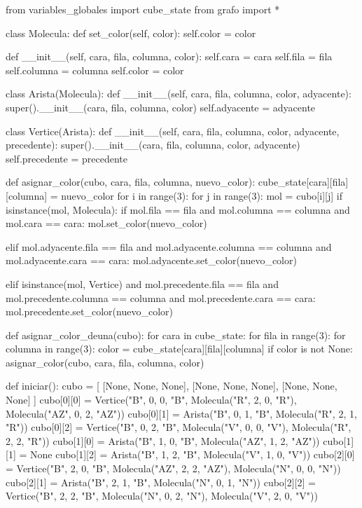 
from variables_globales import cube_state
from grafo import *

class Molecula:
    def set_color(self, color):
        self.color = color
                
    def __init__(self, cara, fila, columna, color):
        self.cara = cara
        self.fila = fila
        self.columna = columna
        self.color = color

class Arista(Molecula):
    def __init__(self, cara, fila, columna, color, adyacente):
        super().__init__(cara, fila, columna, color)
        self.adyacente = adyacente

class Vertice(Arista):
    def __init__(self, cara, fila, columna, color, adyacente, precedente):
        super().__init__(cara, fila, columna, color, adyacente)
        self.precedente = precedente

def asignar_color(cubo, cara, fila, columna, nuevo_color):
    cube_state[cara][fila][columna] = nuevo_color 
    for i in range(3):
        for j in range(3):
            mol = cubo[i][j]
            if isinstance(mol, Molecula):
                if mol.fila == fila and mol.columna == columna and mol.cara == cara:
                    mol.set_color(nuevo_color)
                
                elif mol.adyacente.fila == fila and mol.adyacente.columna == columna and mol.adyacente.cara == cara:
                    mol.adyacente.set_color(nuevo_color)
                    
                elif isinstance(mol, Vertice) and mol.precedente.fila == fila and mol.precedente.columna == columna and mol.precedente.cara == cara:
                    mol.precedente.set_color(nuevo_color)
    
def asignar_color_deuna(cubo):
    for cara in cube_state:
        for fila in range(3):
            for columna in range(3):
                color = cube_state[cara][fila][columna]
                if color is not None:
                    asignar_color(cubo, cara, fila, columna, color)
    
def iniciar():
    cubo = [
        [None, None, None],
        [None, None, None],
        [None, None, None]
    ]
    cubo[0][0] = Vertice("B", 0, 0, "B", Molecula("R", 2, 0, "R"), Molecula("AZ", 0, 2, "AZ"))
    cubo[0][1] = Arista("B", 0, 1, "B", Molecula("R", 2, 1, "R"))
    cubo[0][2] = Vertice("B", 0, 2, "B", Molecula("V", 0, 0, "V"), Molecula("R", 2, 2, "R"))
    cubo[1][0] = Arista("B", 1, 0, "B", Molecula("AZ", 1, 2, "AZ"))
    cubo[1][1] = None
    cubo[1][2] = Arista("B", 1, 2, "B", Molecula("V", 1, 0, "V"))
    cubo[2][0] = Vertice("B", 2, 0, "B", Molecula("AZ", 2, 2, "AZ"), Molecula("N", 0, 0, "N"))
    cubo[2][1] = Arista("B", 2, 1, "B", Molecula("N", 0, 1, "N"))
    cubo[2][2] = Vertice("B", 2, 2, "B", Molecula("N", 0, 2, "N"), Molecula("V", 2, 0, "V"))
    
